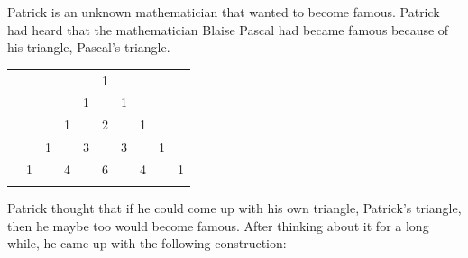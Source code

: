 

Patrick is an unknown mathematician that wanted to become famous. Patrick had heard that the mathematician Blaise Pascal had became famous because of his triangle, Pascal's triangle.

\begin{center}
\begin{tabular}{rccccccccc}
&    &    &    &    &  1\\\noalign{\smallskip\smallskip}
&    &    &    &  1 &    &  1\\\noalign{\smallskip\smallskip}
&    &    &  1 &    &  2 &    &  1\\\noalign{\smallskip\smallskip}
&    &  1 &    &  3 &    &  3 &    &  1\\\noalign{\smallskip\smallskip}
&  1 &    &  4 &    &  6 &    &  4 &    &  1\\\noalign{\smallskip\smallskip}
\end{tabular}
\end{center}

Patrick thought that if he could come up with his own triangle, Patrick's triangle, then he maybe too would become famous. 
After thinking about it for a long while, he came up with the following construction:

